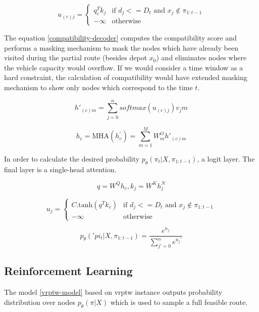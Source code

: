     \begin{equation}\label{compatibility-decoder}
        u_{(c)j} = \begin{cases} q_c^T k_j &\mbox{if }  d_j <= D_t \text{ and } x_j \notin \pi_{1:t-1} \\ -\infty &\mbox{otherwise} \end{cases}
    \end{equation}
    
    The equation \ref{compatibility-decoder} computes the compatibility score and performs a masking mechanism to mask the nodes which have already been visited during the partial route (besides depot $x_0$) and eliminates nodes where the vehicle capacity would overflow. If we would consider a time window as a hard constraint, the calculation of compatibility would have extended masking mechanism to show only nodes which correspond to the time $t$.
    
    \begin{equation}
        h'_{(c)m} = \sum_{j=0}^n softmax(u_{(c)j}) v_jm
    \end{equation}
        
    \begin{equation}
        h_{c} = \text{MHA}(h_{c}^{'}) = \sum_{m=1}^M W_{m}^O h'_{(c)m}
    \end{equation}
    
    In order to calculate the desired probability $p_{\theta}(\pi_t|X, \pi_{1:t-1})$, a logit layer. The final layer is a single-head attention.
    
    \begin{equation}
        q = W^Q h_c, k_j = W^K h_j^N
    \end{equation}
    
    \begin{equation}
        u_j = \begin{cases} C . \text{tanh}(q^T k_{c}) &\mbox{if }  d_j <= D_t \text{ and } x_j \notin \pi_{1:t-1} \\ -\infty &\mbox{otherwise} \end{cases}
    \end{equation}
    
    \begin{equation}\label{encoder-attention-score}
        p_{\theta}('pi_t|X, \pi_{1:t-1}) = \dfrac{e^{u_j}}{\sum_{j'=0}^n e^{u_j'}}
    \end{equation}
    
    \subsection{Reinforcement Learning}\label{vrptw-rl}
    The model \ref{vrptw-model} based on \gls{vrptw} instance outputs probability distribution over nodes $p_{\theta}(\pi|X)$ which is used to sample a full feasible route.
    
